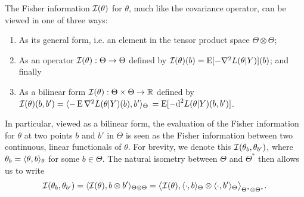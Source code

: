 The Fisher information ${\mathcal I}(\theta)$ for $\theta$, much like the covariance operator, can be viewed in one of three ways: 
\begin{enumerate}
  \item As its general form, i.e. an element in the tensor product space $\Theta\otimes\Theta$;
  \item As an operator ${\mathcal I}(\theta):\Theta\to\Theta$ defined by ${\mathcal I}(\theta)(b) = \operatorname{E}[- \nabla^2 L(\theta|Y)](b)$; and finally
  \item As a bilinear form ${\mathcal I}(\theta):\Theta\times\Theta\to\mathbb{R}$ defined by ${\mathcal I}(\theta)(b,b') = \langle-\operatorname{E} \nabla^2 L(\theta|Y)(b), b'\rangle_\Theta$ $= \operatorname{E} [-\text{d}^2 L(\theta|Y)(b,b') ]$.
\end{enumerate}
In particular, viewed as a bilinear form, the evaluation of the Fisher information for $\theta$ at two points $b$ and $b'$ in $\Theta$ is seen as the Fisher information between two continuous, linear functionals of $\theta$.
For brevity, we denote this ${\mathcal I}(\theta_b,\theta_{b'})$, where $\theta_b = \langle\theta,b\rangle_\theta$ for some $b\in\Theta$.
The natural isometry between $\Theta$ and $\Theta^*$ then allows us to write 
\begin{align}\label{eq:fisher-linear-functional}
  {\mathcal I}(\theta_b,\theta_{b'}) = \langle{\mathcal I}(\theta), b \otimes b'\rangle_{\Theta\otimes\Theta} = \big\langle{\mathcal I}(\theta), \langle\cdot,b\rangle_\Theta \otimes \langle\cdot,b'\rangle_\Theta \big\rangle_{\Theta^*\otimes\Theta^*}.
\end{align}


